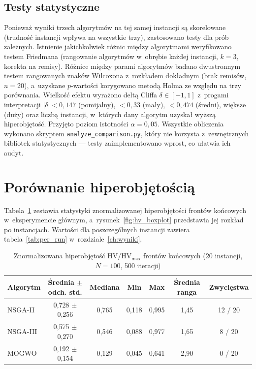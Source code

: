 \subsection{Testy statystyczne}
\label{sec:analiza_testy}
Ponieważ wyniki trzech algorytmów na tej samej instancji są skorelowane
(trudność instancji wpływa na wszystkie trzy), zastosowano testy dla prób zależnych.
Istnienie jakichkolwiek różnic między algorytmami weryfikowano testem Friedmana
(rangowanie algorytmów w~obrębie każdej instancji, $k = 3$, korekta na remisy).
Różnice między parami algorytmów badano dwustronnym testem rangowanych znaków
Wilcoxona z~rozkładem dokładnym (brak remisów, $n = 20$), a~uzyskane
$p$-wartości korygowano metodą Holma ze względu na trzy porównania. Wielkość efektu
wyrażono deltą Cliffa $\delta \in [-1, 1]$ z~progami interpretacji
$|\delta| < 0{,}147$ (pomijalny), $< 0{,}33$ (mały), $< 0{,}474$ (średni), większe
(duży) oraz liczbą instancji, w~których dany algorytm uzyskał wyższą hiperobjętość.
Przyjęto poziom istotności $\alpha = 0{,}05$. Wszystkie obliczenia wykonano
skryptem \texttt{analyze\_comparison.py}, który nie korzysta z~zewnętrznych
bibliotek statystycznych --- testy zaimplementowano wprost, co ułatwia ich
audyt.

\section{Porównanie hiperobjętością}
\label{sec:analiza_hv}

Tabela~\ref{tab:hv_summary} zestawia statystyki znormalizowanej hiperobjętości
frontów końcowych w~eksperymencie głównym, a~rysunek~\ref{fig:hv_boxplot}
przedstawia jej rozkład po instancjach. Wartości dla poszczególnych instancji
zawiera tabela~\ref{tab:per_run} w~rozdziale~\ref{ch:wyniki}.

\begin{table}[htbp]
    \centering
    \caption{Znormalizowana hiperobjętość $\mathrm{HV}/\mathrm{HV}_{\max}$ frontów końcowych (20 instancji, $N = 100$, 500 iteracji)}
    \label{tab:hv_summary}
    \begin{tabular}{l c c c c c c}
        \hline
        Algorytm & Średnia $\pm$ odch. std. & Mediana & Min & Max & Średnia ranga & Zwycięstwa \\
        \hline
        NSGA-II & 0{,}728 $\pm$ 0{,}256 & 0{,}765 & 0{,}118 & 0{,}995 & 1{,}45 & 12 / 20 \\
        NSGA-III & 0{,}575 $\pm$ 0{,}270 & 0{,}546 & 0{,}088 & 0{,}977 & 1{,}65 & 8 / 20 \\
        MOGWO & 0{,}192 $\pm$ 0{,}154 & 0{,}129 & 0{,}045 & 0{,}641 & 2{,}90 & 0 / 20 \\
        \hline
    \end{tabular}
\end{table}

